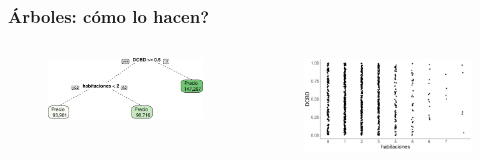 \documentclass[
  shownotes,
  xcolor={svgnames},
  hyperref={colorlinks,citecolor=DarkBlue,linkcolor=DarkRed,urlcolor=DarkBlue}
  , aspectratio=169]{beamer}
\begin{document}
\begin{frame}[fragile]
\frametitle{Árboles: cómo lo hacen?}




\begin{columns}[T] %
\begin{column}{.42\textwidth}
  
\begin{figure}[H] \centering
            \captionsetup{justification=centering}
              \includegraphics[scale=0.4]{figures/trees.pdf}                           
 \end{figure}

\end{column}  
\hfill
\begin{column}{.48\textwidth}

 \begin{figure}[H] \centering
            \captionsetup{justification=centering}
              \includegraphics[scale=0.25]{figures/dcbd_hab.pdf}                           
 \end{figure}

\end{column}
\end{columns}
\end{frame}

\end{document}
